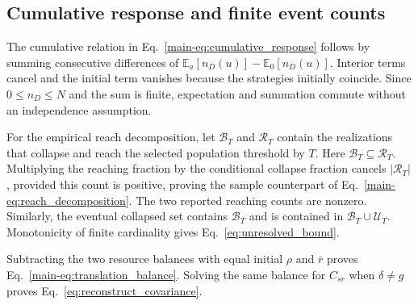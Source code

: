 \subsection{Cumulative response and finite event counts}

The cumulative relation in Eq.~\eqref{main-eq:cumulative_response} follows by summing consecutive differences of $\mathbb E_a[n_D(u)]-\mathbb E_0[n_D(u)]$. Interior terms cancel and the initial term vanishes because the strategies initially coincide. Since $0\le n_D\le N$ and the sum is finite, expectation and summation commute without an independence assumption.

For the empirical reach decomposition, let $\mathcal B_T$ and $\mathcal R_T$ contain the realizations that collapse and reach the selected population threshold by $T$. Here $\mathcal B_T\subseteq\mathcal R_T$. Multiplying the reaching fraction by the conditional collapse fraction cancels $|\mathcal R_T|$, provided this count is positive, proving the sample counterpart of Eq.~\eqref{main-eq:reach_decomposition}. The two reported reaching counts are nonzero. Similarly, the eventual collapsed set contains $\mathcal B_T$ and is contained in $\mathcal B_T\cup\mathcal U_T$. Monotonicity of finite cardinality gives Eq.~\eqref{eq:unresolved_bound}.

Subtracting the two resource balances with equal initial $\rho$ and $\bar r$ proves Eq.~\eqref{main-eq:translation_balance}. Solving the same balance for $C_{sr}$ when $\delta\ne g$ proves Eq.~\eqref{eq:reconstruct_covariance}.
